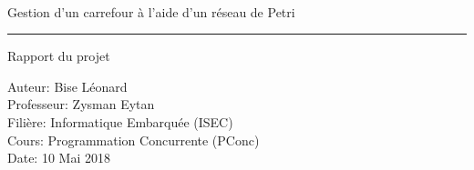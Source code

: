 \documentclass[11pt,a4paper, openany]{memoir}
\begin{document}

\thispagestyle{empty}

\sffamily


\large

~\vspace{\fill}

\begin{center}
{\HUGE 
Gestion d'un carrefour à l'aide d'un réseau de Petri
}
\vspace{1cm}
\hrule
\vspace{1cm}
{\LARGE
Rapport du projet
}
\end{center}

\vspace{3.5cm}

\begin{flushleft}
Auteur: Bise Léonard\\
Professeur: Zysman Eytan\\
Filière: Informatique Embarquée (ISEC)\\
Cours: Programmation Concurrente (PConc)\\
Date: 10 Mai 2018
\end{flushleft}

\vspace{\fill}

\cleardoublepage


\tableofcontents

\clearpage


\end{document}

